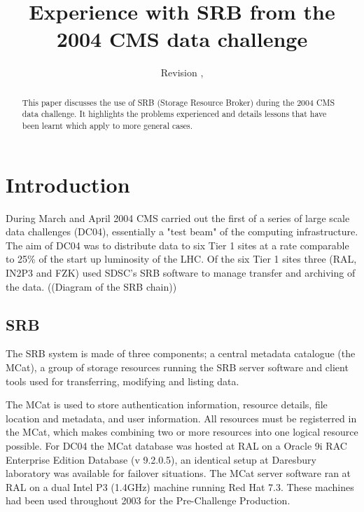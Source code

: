 \documentclass{cmspaper}
\begin{document}
\begin{titlepage}
  \date{Revision \RCSRevision, \RCSDate}
  \title{Experience with SRB from the 2004 CMS data challenge}

  \begin{Authlist}
  \end{Authlist}


  \begin{abstract}
	This paper discusses the use of SRB (Storage Resource Broker) during the 2004 CMS
	data challenge. It highlights the problems experienced and details lessons that 
	have been learnt which apply to more general cases.
  \end{abstract} 

\end{titlepage}

\setcounter{page}{2}

\section{Introduction}
During March and April 2004 CMS carried out the first of a series of large scale data challenges (DC04), 
essentially a "test beam" of the computing infrastructure. The aim of DC04 was to distribute data 
to six Tier 1 sites at a rate comparable to 25\% of the start up luminosity of the LHC.
Of the six Tier 1 sites three (RAL, IN2P3 and FZK) used SDSC's SRB software to manage transfer and 
archiving of the data.
((Diagram of the SRB chain))

\subsection{SRB}

The SRB system is made of three components; a central metadata catalogue (the MCat), a group of 
storage resources running the SRB server software and client tools used for transferring, 
modifying and listing data.

The MCat is used to store authentication information, resource details, file location and 
metadata, and user information. All resources must be registerred in the MCat, which makes 
combining two or more resources into one logical resource possible. For DC04 the MCat database 
was hosted at RAL on a Oracle 9i RAC Enterprise Edition Database (v 9.2.0.5), an identical 
setup at Daresbury laboratory was available for failover situations. The MCat server software 
ran at RAL on a dual Intel P3 (1.4GHz) machine running Red Hat 7.3. These machines had been used
throughout 2003 for the Pre-Challenge Production.
\end{document}
